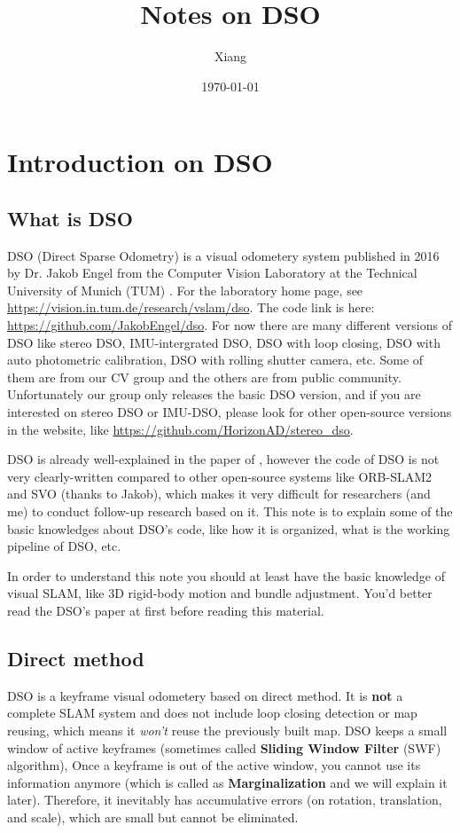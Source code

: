 \documentclass[a4paper,10pt]{article}
\title{Notes on DSO}
\author{Xiang}
\date{\today}
\begin{document}
	\maketitle
	
	\section{Introduction on DSO}
	\subsection{What is DSO}
	DSO (Direct Sparse Odometry) is a visual odometery system published in 2016 by Dr. Jakob Engel from the Computer Vision Laboratory at the Technical University of Munich (TUM) \cite{engel2017direct}. For the laboratory home page, see \url{https://vision.in.tum.de/research/vslam/dso}. The code link is here: \url{https://github.com/JakobEngel/dso}. For now there are many different versions of DSO like stereo DSO, IMU-intergrated DSO, DSO with loop closing, DSO with auto photometric calibration, DSO with rolling shutter camera, etc. Some of them are from our CV group and the others are from public community. Unfortunately our group only releases the basic DSO version, and if you are interested on stereo DSO or IMU-DSO, please look for other open-source versions in the website, like \url{https://github.com/HorizonAD/stereo_dso}. 

	DSO is already well-explained in the paper of \cite{engel2017direct}, however the code of DSO is not very clearly-written compared to other open-source systems like ORB-SLAM2 and SVO (thanks to Jakob), which makes it very  difficult for researchers (and me) to conduct follow-up research based on it. This note is to explain some of the basic knowledges about DSO's code, like how it is organized, what is the working pipeline of DSO, etc. 
	
	In order to understand this note you should at least have the basic knowledge of visual SLAM, like 3D rigid-body motion and bundle adjustment. You'd better read the DSO's paper at first before reading this material.
	
	\subsection{Direct method}
	DSO is a keyframe visual odometery based on direct method. It is \textbf{not} a complete SLAM system and does not include loop closing detection or map reusing, which means it \emph{won't} reuse the previously built map. DSO keeps a small window of active keyframes (sometimes called \textbf{Sliding Window Filter} (SWF) algorithm), Once a keyframe is out of the active window, you cannot use its information anymore (which is called as \textbf{Marginalization} and we will explain it later). Therefore, it inevitably has accumulative errors (on rotation, translation, and scale), which are small but cannot be eliminated. 
	
\end{document}
